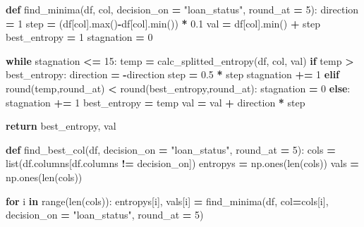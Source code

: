 \documentclass[
]{book}
\newenvironment{Shaded}{\begin{snugshade}}{\end{snugshade}}
\newcommand{\BuiltInTok}[1]{#1}
\newcommand{\ControlFlowTok}[1]{\textcolor[rgb]{0.13,0.29,0.53}{\textbf{#1}}}
\newcommand{\DecValTok}[1]{\textcolor[rgb]{0.00,0.00,0.81}{#1}}
\newcommand{\FloatTok}[1]{\textcolor[rgb]{0.00,0.00,0.81}{#1}}
\newcommand{\KeywordTok}[1]{\textcolor[rgb]{0.13,0.29,0.53}{\textbf{#1}}}
\newcommand{\NormalTok}[1]{#1}
\newcommand{\OperatorTok}[1]{\textcolor[rgb]{0.81,0.36,0.00}{\textbf{#1}}}
\newcommand{\StringTok}[1]{\textcolor[rgb]{0.31,0.60,0.02}{#1}}
\begin{document}
\begin{Shaded}
\begin{Highlighting}[]
\KeywordTok{def}\NormalTok{ find\_minima(df, col, decision\_on }\OperatorTok{=} \StringTok{"loan\_status"}\NormalTok{, round\_at }\OperatorTok{=} \DecValTok{5}\NormalTok{):}
\NormalTok{  direction }\OperatorTok{=} \DecValTok{1}
\NormalTok{  step }\OperatorTok{=}\NormalTok{ (df[col].}\BuiltInTok{max}\NormalTok{()}\OperatorTok{{-}}\NormalTok{df[col].}\BuiltInTok{min}\NormalTok{()) }\OperatorTok{*} \FloatTok{0.1}
\NormalTok{  val }\OperatorTok{=}\NormalTok{ df[col].}\BuiltInTok{min}\NormalTok{() }\OperatorTok{+}\NormalTok{ step}
\NormalTok{  best\_entropy }\OperatorTok{=} \DecValTok{1}
\NormalTok{  stagnation }\OperatorTok{=} \DecValTok{0}
  
  \ControlFlowTok{while}\NormalTok{ stagnation }\OperatorTok{\textless{}=} \DecValTok{15}\NormalTok{:}
\NormalTok{    temp }\OperatorTok{=}\NormalTok{ calc\_splitted\_entropy(df, col, val)}
    \ControlFlowTok{if}\NormalTok{ temp }\OperatorTok{\textgreater{}}\NormalTok{ best\_entropy:}
\NormalTok{      direction }\OperatorTok{=} \OperatorTok{{-}}\NormalTok{direction}
\NormalTok{      step }\OperatorTok{=} \FloatTok{0.5} \OperatorTok{*}\NormalTok{ step}
\NormalTok{      stagnation }\OperatorTok{+=} \DecValTok{1}
    \ControlFlowTok{elif} \BuiltInTok{round}\NormalTok{(temp,round\_at) }\OperatorTok{\textless{}} \BuiltInTok{round}\NormalTok{(best\_entropy,round\_at):}
\NormalTok{      stagnation }\OperatorTok{=} \DecValTok{0}
    \ControlFlowTok{else}\NormalTok{:}
\NormalTok{      stagnation }\OperatorTok{+=} \DecValTok{1}
\NormalTok{    best\_entropy }\OperatorTok{=}\NormalTok{ temp}
\NormalTok{    val }\OperatorTok{=}\NormalTok{ val }\OperatorTok{+}\NormalTok{ direction }\OperatorTok{*}\NormalTok{ step}
    
  \ControlFlowTok{return}\NormalTok{ best\_entropy, val}


\KeywordTok{def}\NormalTok{ find\_best\_col(df, decision\_on }\OperatorTok{=} \StringTok{"loan\_status"}\NormalTok{, round\_at }\OperatorTok{=} \DecValTok{5}\NormalTok{):}
\NormalTok{  cols }\OperatorTok{=} \BuiltInTok{list}\NormalTok{(df.columns[df.columns }\OperatorTok{!=}\NormalTok{ decision\_on])}
\NormalTok{  entropys }\OperatorTok{=}\NormalTok{ np.ones(}\BuiltInTok{len}\NormalTok{(cols))}
\NormalTok{  vals }\OperatorTok{=}\NormalTok{ np.ones(}\BuiltInTok{len}\NormalTok{(cols))}
  
  \ControlFlowTok{for}\NormalTok{ i }\KeywordTok{in} \BuiltInTok{range}\NormalTok{(}\BuiltInTok{len}\NormalTok{(cols)):}
\NormalTok{    entropys[i], vals[i] }\OperatorTok{=}\NormalTok{ find\_minima(df, col}\OperatorTok{=}\NormalTok{cols[i], decision\_on }\OperatorTok{=} \StringTok{"loan\_status"}\NormalTok{, round\_at }\OperatorTok{=} \DecValTok{5}\NormalTok{)}
  

\end{Highlighting}
\end{Shaded}
\end{document}
